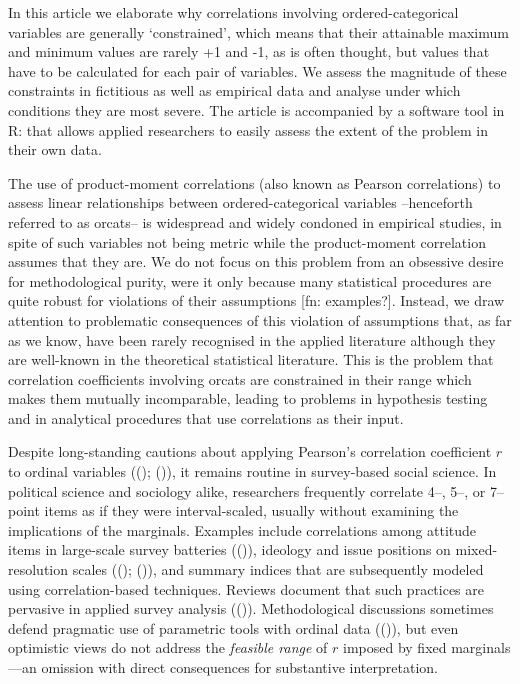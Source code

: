 \documentclass[
  12pt,
]{article}
\theoremstyle{plain}
\theoremstyle{definition}
\theoremstyle{remark}
\begin{document}
In this article we elaborate why correlations involving
ordered-categorical variables are generally `constrained', which means
that their attainable maximum and minimum values are rarely +1 and -1,
as is often thought, but values that have to be calculated for each pair
of variables. We assess the magnitude of these constraints in fictitious
as well as empirical data and analyse under which conditions they are
most severe. The article is accompanied by a software tool in R: that
allows applied researchers to easily assess the extent of the problem in
their own data.

The use of product-moment correlations (also known as Pearson
correlations) to assess linear relationships between ordered-categorical
variables --henceforth referred to as orcats-- is widespread and widely
condoned in empirical studies, in spite of such variables not being
metric while the product-moment correlation assumes that they are. We do
not focus on this problem from an obsessive desire for methodological
purity, were it only because many statistical procedures are quite
robust for violations of their assumptions {[}fn: examples?{]}. Instead,
we draw attention to problematic consequences of this violation of
assumptions that, as far as we know, have been rarely recognised in the
applied literature although they are well-known in the theoretical
statistical literature. This is the problem that correlation
coefficients involving orcats are constrained in their range which makes
them mutually incomparable, leading to problems in hypothesis testing
and in analytical procedures that use correlations as their input.

Despite long-standing cautions about applying Pearson's correlation
coefficient \(r\) to ordinal variables
(();
()), it remains routine in
survey-based social science. In political science and sociology alike,
researchers frequently correlate 4--, 5--, or 7--point items as if they
were interval-scaled, usually without examining the implications of the
marginals. Examples include correlations among attitude items in
large-scale survey batteries (()), ideology and issue positions on mixed-resolution
scales (();
()), and summary indices
that are subsequently modeled using correlation-based techniques.
Reviews document that such practices are pervasive in applied survey
analysis (()).
Methodological discussions sometimes defend pragmatic use of parametric
tools with ordinal data (()),
but even optimistic views do not address the \emph{feasible range} of
\(r\) imposed by fixed marginals---an omission with direct consequences
for substantive interpretation.
\end{document}
